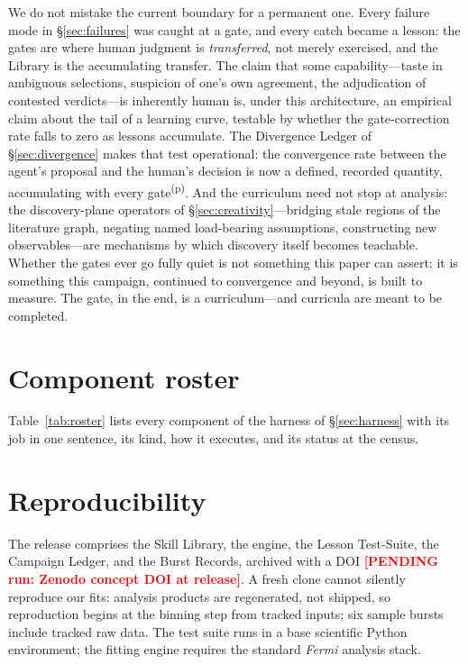 \documentclass[twocolumn]{aastex631}
\newcommand{\PENDING}[1]{\textbf{\textcolor{red}{[PENDING run: #1]}}}
\newcommand{\prov}{\textsuperscript{(p)}}
\begin{document}
We do not mistake the current boundary for a permanent one. Every failure
mode in \S\ref{sec:failures} was caught at a gate, and every catch became a
lesson: the gates are where human judgment is \emph{transferred}, not merely
exercised, and the Library is the accumulating transfer. The claim that some
capability---taste in ambiguous selections, suspicion of one's own
agreement, the adjudication of contested verdicts---is inherently human is,
under this architecture, an empirical claim about the tail of a learning
curve, testable by whether the gate-correction rate falls to zero as
lessons accumulate. The Divergence Ledger of \S\ref{sec:divergence} makes
that test operational: the convergence rate between the agent's proposal
and the human's decision is now a defined, recorded quantity, accumulating
with every gate\prov.
And the curriculum need not stop at analysis: the
discovery-plane operators of \S\ref{sec:creativity}---bridging stale regions
of the literature graph, negating named load-bearing assumptions,
constructing new observables---are mechanisms by which discovery itself
becomes teachable. Whether the gates ever go fully quiet is not something
this paper can assert; it is something this campaign, continued to
convergence and beyond, is built to measure. The gate, in the end, is a
curriculum---and curricula are meant to be completed.

\appendix
\section{Component roster} \label{app:roster}
Table~\ref{tab:roster} lists every component of the harness of \S\ref{sec:harness} with its job in one sentence, its kind, how it executes, and its status at the census.


\section{Reproducibility} \label{app:repro}
The release comprises the Skill Library, the engine, the Lesson
Test-Suite, the Campaign Ledger, and the Burst Records, archived with a
DOI \PENDING{Zenodo concept DOI at release}. A fresh clone cannot silently
reproduce our fits: analysis products are regenerated, not shipped, so
reproduction begins at the binning step from tracked inputs; six sample
bursts include tracked raw data. The test suite runs in a base scientific
Python environment; the fitting engine requires the standard \textit{Fermi}
analysis stack.
\end{document}
